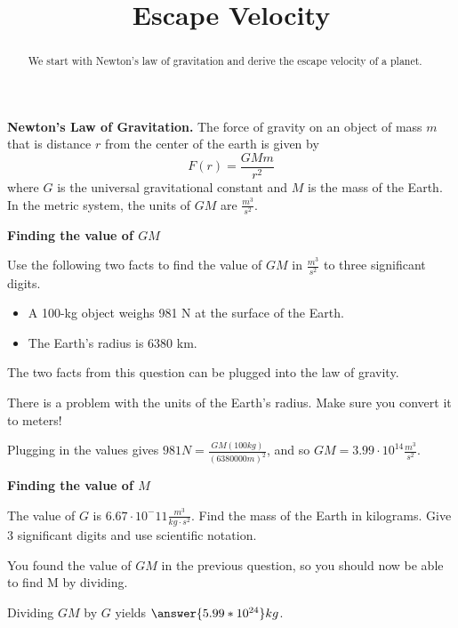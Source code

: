 \documentclass{ximera}
\title{Escape Velocity}
\begin{document}
\begin{abstract}
We start with Newton's law of gravitation and derive the escape velocity of a planet.
\end{abstract}
\maketitle

\begin{observation}
\textbf{Newton's Law of Gravitation.} The force of gravity on an object of mass $m$ that is distance $r$ from the center of the earth is given by
$$ F(r) = \frac{G M m}{r^2}$$
where $G$ is the universal gravitational constant and $M$ is the mass of the Earth. In the metric system, the units of $G M$ are $\frac{m^3}{s^2}$.
\end{observation}

\textbf{Finding the value of $GM$}

\begin{question}
Use the following two facts to find the value of $GM$ in $\frac{m^3}{s^2}$ to three significant digits. 
\begin{itemize}
\item A 100-kg object weighs 981 N at the surface of the Earth.
\item The Earth's radius is 6380 km.
\end{itemize}
\begin{solution}
\begin{multiple-choice}
\end{multiple-choice}
\begin{hint}
The two facts from this question can be plugged into the law of gravity.
\end{hint}
\begin{hint}
There is a problem with the units of the Earth's radius. Make sure you convert it to meters!
\end{hint}
Plugging in the values gives $981 N = \frac{GM (100 kg)}{(6380000 m)^2}$, and so $GM = 3.99 \cdot 10^{14} \frac{m^3}{s^2}$.
\end{solution}
\end{question}

\textbf{Finding the value of $M$}

\begin{question}
The value of $G$ is $6.67 \cdot 10^-{11} \frac{m^3}{kg \cdot s^2}$. Find the mass of the Earth in kilograms. Give 3 significant digits and use scientific notation.
\begin{solution}
\begin{hint}
You found the value of $G M$ in the previous question, so you should now be able to find M by dividing.
\end{hint}
Dividing $G M$ by $G$ yields $\answer{5.99*10^{24}} kg$.
\end{solution}
\end{question}
\end{document}
